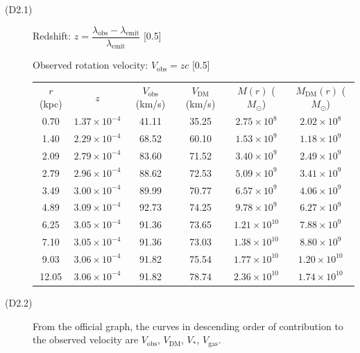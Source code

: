 \begin{description}
\item[(D2.1)] Redshift:
  $z = \dfrac{\lambda_{\mathrm{obs}} - \lambda_{\mathrm{emit}}}
             {\lambda_{\mathrm{emit}}}$ \hfill[0.5]

  Observed rotation velocity: $V_{\mathrm{obs}} = zc$ \hfill[0.5]

  \begin{center}
  \begin{tabular}{cccccc}
  $r$ (kpc) & $z$ & $V_{\mathrm{obs}}$ (km/s) & $V_{\mathrm{DM}}$ (km/s)
    & $M(r)$ ($M_\odot$) & $M_{\mathrm{DM}}(r)$ ($M_\odot$)\\
  0.70 & $1.37\times 10^{-4}$ & 41.11 & 35.25
    & $2.75\times 10^{8}$ & $2.02\times 10^{8}$\\
  1.40 & $2.29\times 10^{-4}$ & 68.52 & 60.10
    & $1.53\times 10^{9}$ & $1.18\times 10^{9}$\\
  2.09 & $2.79\times 10^{-4}$ & 83.60 & 71.52
    & $3.40\times 10^{9}$ & $2.49\times 10^{9}$\\
  2.79 & $2.96\times 10^{-4}$ & 88.62 & 72.53
    & $5.09\times 10^{9}$ & $3.41\times 10^{9}$\\
  3.49 & $3.00\times 10^{-4}$ & 89.99 & 70.77
    & $6.57\times 10^{9}$ & $4.06\times 10^{9}$\\
  4.89 & $3.09\times 10^{-4}$ & 92.73 & 74.25
    & $9.78\times 10^{9}$ & $6.27\times 10^{9}$\\
  6.25 & $3.05\times 10^{-4}$ & 91.36 & 73.65
    & $1.21\times 10^{10}$ & $7.88\times 10^{9}$\\
  7.10 & $3.05\times 10^{-4}$ & 91.36 & 73.03
    & $1.38\times 10^{10}$ & $8.80\times 10^{9}$\\
  9.03 & $3.06\times 10^{-4}$ & 91.82 & 75.54
    & $1.77\times 10^{10}$ & $1.20\times 10^{10}$\\
  12.05 & $3.06\times 10^{-4}$ & 91.82 & 78.74
    & $2.36\times 10^{10}$ & $1.74\times 10^{10}$
  \end{tabular}
  \end{center}

\item[(D2.2)]
  From the official graph, the curves in descending order of contribution
  to the observed velocity are $V_{\mathrm{obs}}$, $V_{\mathrm{DM}}$,
  $V_{*}$, $V_{\mathrm{gas}}$.


\end{description}
